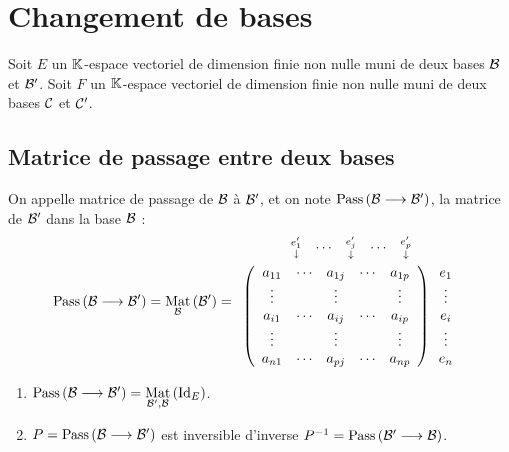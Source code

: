 \section{Changement de bases}
Soit \(E\) un \(\K\)-espace vectoriel de dimension finie non nulle muni de deux bases \(\cal{B}\) et \(\cal{B'}\).
Soit \(F\) un \(\K\)-espace vectoriel de dimension finie non nulle muni de deux bases \(\cal{C}\) et \(\cal{C'}\).

\subsection{Matrice de passage entre deux bases}
\begin{defi}
    On appelle matrice de passage de \(\cal{B}\) à \(\cal{B'}\), et on note \(\pass{\cal{B}}{\cal{B'}}\), la matrice de \(\cal{B'}\) dans la base \(\cal{B}\) :
    \[\pass{\cal{B}}{\cal{B'}} = \Mat{\cal{B}}{\cal{B'}} = 
\begin{array}{c}
  \begin{array}{cccccc}
     \substack{e'_1 \\ \downarrow} 
     & \cdots 
     & \substack{e'_j \\ \downarrow} 
     & \cdots 
     & \substack{e'_p \\ \downarrow}
  \end{array} \\[6pt]
  \left(
  \begin{array}{ccccc}
  a_{11} & \cdots & a_{1j} & \cdots & a_{1p} \\
  \vdots &        & \vdots &        & \vdots \\
  a_{i1} & \cdots & a_{ij} & \cdots & a_{ip} \\
  \vdots &        & \vdots &        & \vdots \\
  a_{n1} & \cdots & a_{pj} & \cdots & a_{np}
  \end{array}
  \right)
  \begin{array}{c}
  e_1 \\
  \vdots \\
  e_i \\
  \vdots \\
  e_n
  \end{array}
\end{array}
\]
\end{defi}

\begin{prop}
    \begin{enumerate}
        \item \(\pass{\cal{B}}{\cal{B'}}=  \Mat{\cal{B'}, \cal{B}}{\id{E}}\).
        \item \(P = \pass{\cal{B}}{\cal{B'}}\) est inversible d’inverse \(P^{-1} = \pass{\cal{B'}}{\cal{B}}\).
    \end{enumerate}
\end{prop}

